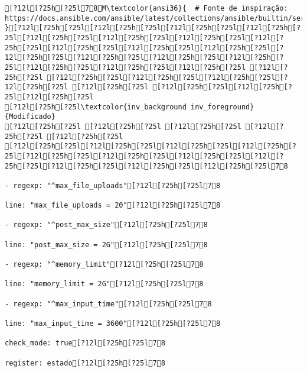 \documentclass{scrartcl}
\begin{document}
\begin{Verbatim}
[?12l[?25h[?25l78M\textcolor{ansi36}{  # Fonte de inspiração: https://docs.ansible.com/ansible/latest/collections/ansible/builtin/service_module.html
}[?12l[?25h[?25l[?12l[?25h[?25l[?12l[?25h[?25l[?12l[?25h[?25l[?12l[?25h[?25l[?12l[?25h[?25l[?12l[?25h[?25l[?12l[?25h[?25l[?12l[?25h[?25l[?12l[?25h[?25l[?12l[?25h[?25l[?12l[?25h[?25l[?12l[?25h[?25l[?12l[?25h[?25l[?12l[?25h[?25l[?12l[?25h[?25l[?12l[?25h[?25l[?12l[?25h[?25l [?12l[?25h[?25l [?12l[?25h[?25l[?12l[?25h[?25l[?12l[?25h[?25l[?12l[?25h[?25l [?12l[?25h[?25l [?12l[?25h[?25l[?12l[?25h[?25l[?12l[?25h[?25l
[?12l[?25h[?25l\textcolor{inv_background inv_foreground}{Modificado}
[?12l[?25h[?25l [?12l[?25h[?25l [?12l[?25h[?25l [?12l[?25h[?25l [?12l[?25h[?25l
[?12l[?25h[?25l[?12l[?25h[?25l[?12l[?25h[?25l[?12l[?25h[?25l[?12l[?25h[?25l[?12l[?25h[?25l[?12l[?25h[?25l[?12l[?25h[?25l[?12l[?25h[?25l[?12l[?25h[?25l[?12l[?25h[?25l78

- regexp: "^max_file_uploads"[?12l[?25h[?25l78

line: "max_file_uploads = 20"[?12l[?25h[?25l78

- regexp: "^post_max_size"[?12l[?25h[?25l78

line: "post_max_size = 2G"[?12l[?25h[?25l78

- regexp: "^memory_limit"[?12l[?25h[?25l78

line: "memory_limit = 2G"[?12l[?25h[?25l78

- regexp: "^max_input_time"[?12l[?25h[?25l78

line: "max_input_time = 3600"[?12l[?25h[?25l78

check_mode: true[?12l[?25h[?25l78

register: estado[?12l[?25h[?25l78


\end{Verbatim}
\end{document}
